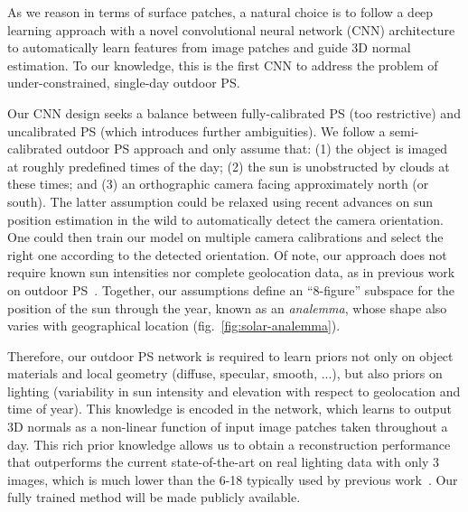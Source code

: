 
As we reason in terms of surface patches, a natural choice is to follow a deep learning approach with a novel convolutional neural network (CNN) architecture to automatically learn features from image patches and guide 3D normal estimation. To our knowledge, this is the first CNN to address the problem of under-constrained, single-day outdoor PS.

Our CNN design seeks a balance between fully-calibrated PS (too restrictive) and uncalibrated PS (which introduces further ambiguities). We follow a semi-calibrated outdoor PS approach and only assume that: (1) the object is imaged at roughly predefined times of the day; (2) the sun is unobstructed by clouds at these times; and (3) an orthographic camera facing approximately north (or south). The latter assumption could be relaxed using recent advances on sun position estimation in the wild to automatically detect the camera orientation. One could then train our model on multiple camera calibrations and select the right one according to the detected orientation. Of note, our approach does not require known sun intensities nor complete geolocation data, as in previous work on outdoor PS~\cite{jung-cvpr-15}. Together, our assumptions define an ``8-figure'' subspace for the position of the sun through the year, known as an {\em analemma}, whose shape also varies with geographical location (fig.~\ref{fig:solar-analemma}).



Therefore, our outdoor PS network is required to learn priors not only on object materials and local geometry (diffuse, specular, smooth, ...), but also priors on lighting (variability in sun intensity and elevation with respect to geolocation and time of year). This knowledge is encoded in the network, which learns to output 3D normals as a non-linear function of input image patches taken throughout a day. This rich prior knowledge allows us to obtain a reconstruction performance that outperforms the current state-of-the-art on real lighting data with only 3 images, which is much lower than the 6-18 typically used by previous work~\cite{yu-iccp-13,jung-cvpr-15}. Our fully trained method will be made publicly available.

